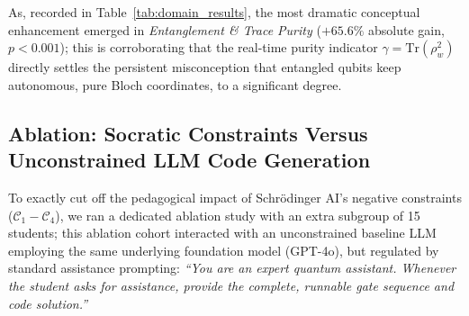 \documentclass[conference]{IEEEtran}
\begin{document}
\begin{table}[t]
\caption{Domain-Specific Conceptual Mastery Breakdown ($N=30$)}
\label{tab:domain_results}
\centering
\renewcommand{\arraystretch}{0.95}
\end{table}

As, recorded in Table~\ref{tab:domain_results}, the most dramatic conceptual enhancement emerged in \textit{Entanglement \& Trace Purity} ($+65.6\%$ absolute gain, $p < 0.001$); this is corroborating that the real-time purity indicator $\gamma = \text{Tr}(\rho_w^2)$ directly settles the persistent misconception that entangled qubits keep autonomous, pure Bloch coordinates, to a significant degree.

\subsection{Ablation: Socratic Constraints Versus Unconstrained LLM Code Generation}
To exactly cut off the pedagogical impact of Schr{\"o}dinger AI's negative constraints ($\mathcal{C}_1-\mathcal{C}_4$), we ran a dedicated ablation study with an extra subgroup of 15 students; this ablation cohort interacted with an unconstrained baseline LLM employing the same underlying foundation model (GPT-4o), but regulated by standard assistance prompting: \textit{``You are an expert quantum assistant. Whenever the student asks for assistance, provide the complete, runnable gate sequence and code solution.''}
\end{document}
